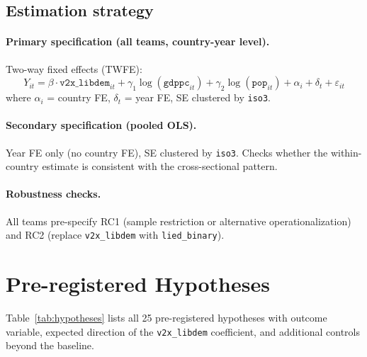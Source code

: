 \documentclass[12pt,a4paper]{article}
\begin{document}
\subsection{Estimation strategy}

\paragraph{Primary specification (all teams, country-year level).}
Two-way fixed effects (TWFE):
\begin{equation}
  Y_{it} = \beta \cdot \texttt{v2x\_libdem}_{it}
           + \gamma_1 \log(\texttt{gdppc}_{it})
           + \gamma_2 \log(\texttt{pop}_{it})
           + \alpha_i + \delta_t + \varepsilon_{it}
\end{equation}
where $\alpha_i$ = country FE, $\delta_t$ = year FE, SE clustered by \texttt{iso3}.

\paragraph{Secondary specification (pooled OLS).}
Year FE only (no country FE), SE clustered by \texttt{iso3}. Checks whether
the within-country estimate is consistent with the cross-sectional pattern.

\paragraph{Robustness checks.} All teams pre-specify RC1 (sample restriction
or alternative operationalization) and RC2 (replace \texttt{v2x\_libdem} with
\texttt{lied\_binary}).

\section{Pre-registered Hypotheses}
\label{sec:hypotheses}

Table~\ref{tab:hypotheses} lists all 25 pre-registered hypotheses with
outcome variable, expected direction of the \texttt{v2x\_libdem} coefficient,
and additional controls beyond the baseline.
\end{document}
